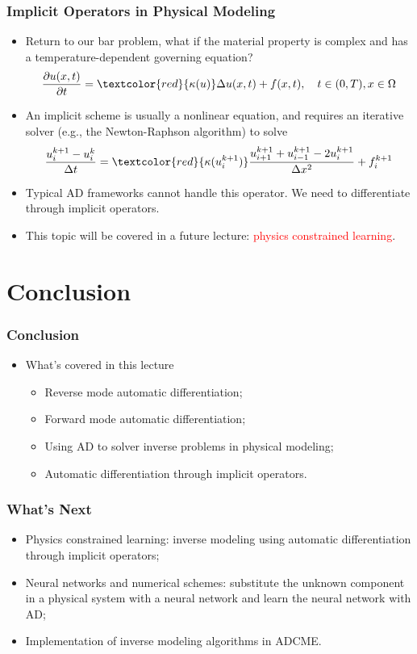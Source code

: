 \documentclass{beamer}
\newcommand{\red}[1]{\textcolor{red}{#1}}
\begin{document}
\begin{frame}
	\frametitle{Implicit Operators in Physical Modeling}
	\begin{itemize}
		\item Return to our bar problem, what if the material property is complex and has a temperature-dependent governing equation?
		      $$\frac{\partial u({x}, t)}{\partial t} = \red{\kappa(u)}\Delta u({x}, t) + f({x}, t), \quad t\in (0,T), x\in \Omega$$
		\item An implicit scheme is usually a nonlinear equation, and requires an iterative solver (e.g., the Newton-Raphson algorithm) to solve
		      $$\frac{u^{k+1}_i-u^k_i}{\Delta t} = \red{\kappa(u_i^{k+1})} \frac{u^{k+1}_{i+1}+u^{k+1}_{i-1}-2u^{k+1}_i}{\Delta x^2} + f_i^{k+1}$$
		\item Typical AD frameworks cannot handle this operator. We need to differentiate through implicit operators.
		\item This topic will be covered in a future lecture: \red{physics constrained learning}.
	\end{itemize}

\end{frame}



\section{Conclusion}

\begin{frame}
	\frametitle{Conclusion}

	\begin{itemize}
		\item What's covered in this lecture
		      \begin{itemize}
			      \item Reverse mode automatic differentiation;
			      \item Forward mode automatic differentiation;
			      \item Using AD to solver inverse problems in physical modeling;
			      \item Automatic differentiation through implicit operators.
		      \end{itemize}
	\end{itemize}

\end{frame}

\begin{frame}
	\frametitle{What's Next}

	\begin{itemize}
		\item Physics constrained learning: inverse modeling using automatic differentiation through implicit operators;
		\item Neural networks and numerical schemes: substitute the unknown component in a physical system with a neural network and learn the neural network with AD;
		\item Implementation of inverse modeling algorithms in ADCME.
	\end{itemize}
\end{frame}
\end{document}
